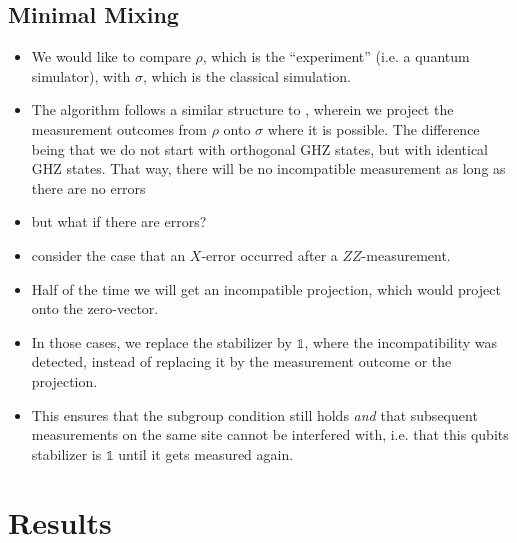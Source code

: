\subsection{Minimal Mixing}
\begin{itemize}
  \item We would like to compare $\rho$, which is the \enquote{experiment}
    (i.e. a quantum simulator), with $\sigma$, which is the classical
    simulation.
  \item The algorithm follows a similar structure to
    \cite{liCrossEntropyBenchmark2023}, wherein we project the measurement
    outcomes from $\rho$ onto $\sigma$ where it is possible. The difference
    being that we do not start with orthogonal GHZ states, but with identical
    GHZ states. That way, there will be no incompatible measurement as long as
    there are no errors
  \item but what if there are errors?
  \item consider the case that an $X$-error occurred after a $ZZ$-measurement.
  \item Half of the time we will get an incompatible projection, which would
    project onto the zero-vector.
  \item In those cases, we replace the stabilizer by $\mathds{1}$, where the
    incompatibility was detected, instead of replacing it by the measurement
    outcome or the projection.
  \item This ensures that the subgroup condition still holds \emph{and} that
    subsequent measurements on the same site cannot be interfered with, i.e.
    that this qubits stabilizer is $\mathds{1}$ until it gets measured again.
\end{itemize}
\section{Results}
